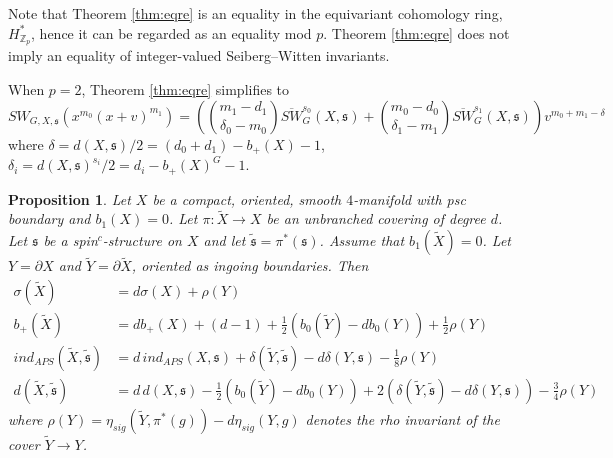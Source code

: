 \documentclass{amsart}
\newtheorem{proposition}[theorem]{Proposition}
\theoremstyle{definition}
\theoremstyle{remark}
\numberwithin{equation}{section}
\begin{document}
Note that Theorem \ref{thm:eqre} is an equality in the equivariant cohomology ring, $H^*_{\mathbb{Z}_p}$, hence it can be regarded as an equality mod $p$. Theorem \ref{thm:eqre} does not imply an equality of integer-valued Seiberg--Witten invariants.

When $p=2$, Theorem \ref{thm:eqre} simplifies to
\[
SW_{G , X , \mathfrak{s}}( x^{m_0}(x+v)^{m_1}) = \left( \binom{m_1 - d_1}{\delta_0 - m_0} \overline{SW}^{s_0}_{G}(X , \mathfrak{s}) + \binom{m_0-d_0}{\delta_1 - m_1} \overline{SW}^{s_1}_G(X , \mathfrak{s}) \right) v^{m_0 + m_1 - \delta}
\]
where $\delta = d(X , \mathfrak{s})/2 = (d_0 + d_1) - b_+(X)-1$, $\delta_i = d(X , \mathfrak{s})^{s_i}/2 = d_i - b_+(X)^G - 1$.

\begin{proposition}\label{prop:ubcov}
Let $X$ be a compact, oriented, smooth $4$-manifold with psc boundary and $b_1(X) = 0$. Let $\pi : \widetilde{X} \to X$ be an unbranched covering of degree $d$. Let $\mathfrak{s}$ be a spin$^c$-structure on $X$ and let $\widetilde{\mathfrak{s}} = \pi^*(\mathfrak{s})$. Assume that $b_1(\widetilde{X}) = 0$. Let $Y = \partial X$ and $\widetilde{Y} = \partial \widetilde{X}$, oriented as ingoing boundaries. Then
\begin{align*}
\sigma(\widetilde{X}) &= d \sigma(X) + \rho(Y) \\
b_+(\widetilde{X}) &= d b_+(X) + (d-1) + \frac{1}{2}( b_0(\widetilde{Y}) - d b_0(Y) ) + \frac{1}{2}\rho(Y) \\
ind_{APS}(\widetilde{X} , \widetilde{\mathfrak{s}}) &= d \, ind_{APS}(X,\mathfrak{s}) + \delta(\widetilde{Y},\widetilde{\mathfrak{s}}) - d \delta(Y ,\mathfrak{s}) - \frac{1}{8}\rho(Y) \\
d(\widetilde{X} , \widetilde{\mathfrak{s}}) &= d \, d(X,\mathfrak{s}) - \frac{1}{2}(b_0(\widetilde{Y}) - d b_0(Y)) + 2(\delta(\widetilde{Y},\widetilde{\mathfrak{s}}) - d \delta(Y,\mathfrak{s})) - \frac{3}{4}\rho(Y)
\end{align*}
where $\rho(Y) = \eta_{sig}( \widetilde{Y} , \pi^*(g) ) - d \eta_{sig}(Y , g)$ denotes the rho invariant of the cover $\widetilde{Y} \to Y$.
\end{proposition}
\end{document}
